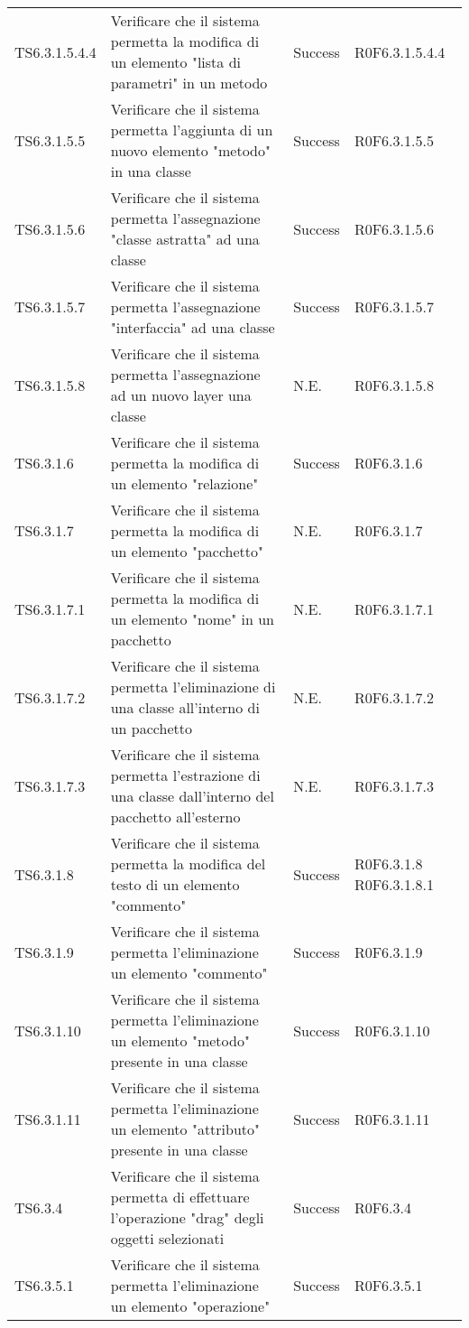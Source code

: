 \begin{longtable}{p{2.5cm}!{\VRule[1pt]}p{6.5cm}!{\VRule[1pt]}p{1cm}!{\VRule[1pt]}p{3cm}}
TS6.3.1.5.4.4 & Verificare che il sistema permetta la modifica di un elemento "lista di parametri" in un metodo & Success & R0F6.3.1.5.4.4\\
TS6.3.1.5.5 & Verificare che il sistema permetta l'aggiunta di un nuovo elemento "metodo" in una classe & Success & R0F6.3.1.5.5\\
TS6.3.1.5.6 & Verificare che il sistema permetta l'assegnazione "classe astratta" ad una classe & Success & R0F6.3.1.5.6\\
TS6.3.1.5.7 & Verificare che il sistema permetta l'assegnazione "interfaccia" ad una classe & Success & R0F6.3.1.5.7\\
TS6.3.1.5.8 & Verificare che il sistema permetta l'assegnazione ad un nuovo layer una classe & N.E. & R0F6.3.1.5.8\\
TS6.3.1.6 & Verificare che il sistema permetta la modifica di un elemento "relazione" & Success & R0F6.3.1.6\\
TS6.3.1.7 & Verificare che il sistema permetta la modifica di un elemento "pacchetto" & N.E. & R0F6.3.1.7\\
TS6.3.1.7.1 & Verificare che il sistema permetta la modifica di un elemento "nome" in un pacchetto & N.E. & R0F6.3.1.7.1\\
TS6.3.1.7.2 & Verificare che il sistema permetta l'eliminazione di una classe all'interno di un pacchetto & N.E. & R0F6.3.1.7.2\\
TS6.3.1.7.3 & Verificare che il sistema permetta l'estrazione di una classe dall'interno del pacchetto all'esterno & N.E. & R0F6.3.1.7.3\\
TS6.3.1.8 & Verificare che il sistema permetta la modifica del testo di un elemento "commento" & Success & R0F6.3.1.8 R0F6.3.1.8.1\\
TS6.3.1.9 & Verificare che il sistema permetta l'eliminazione un elemento "commento" & Success & R0F6.3.1.9\\
TS6.3.1.10 & Verificare che il sistema permetta l'eliminazione un elemento "metodo" presente in una classe & Success & R0F6.3.1.10\\
TS6.3.1.11 & Verificare che il sistema permetta l'eliminazione un elemento "attributo" presente in una classe & Success & R0F6.3.1.11\\
TS6.3.4 & Verificare che il sistema permetta di effettuare l'operazione "drag" degli oggetti selezionati & Success & R0F6.3.4\\
TS6.3.5.1 & Verificare che il sistema permetta l'eliminazione un elemento "operazione" & Success & R0F6.3.5.1\\

\end{longtable}
